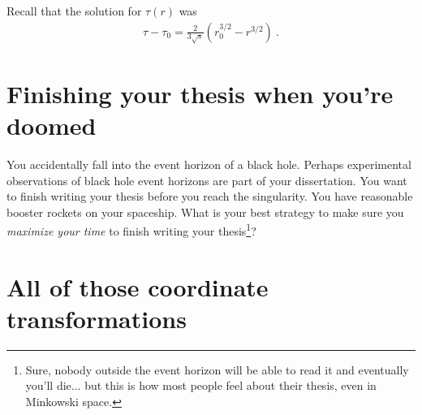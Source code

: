 \documentclass[12pt]{article}
\numberwithin{equation}{section}    %
\begin{document}
Recall that the solution for $\tau(r)$ was
\begin{align}
	\tau - \tau_0 = \frac{2}{3\sqrt{s}} \left(r_0^{3/2} - r^{3/2}\right) \ .
\end{align}

\section{Finishing your thesis when you're doomed}

You accidentally fall into the event horizon of a black hole. Perhaps experimental observations of black hole event horizons are part of your dissertation. You want to finish writing your thesis before you reach the singularity. You have reasonable booster rockets on your spaceship. What is your best strategy to make sure you \emph{maximize your time} to finish writing your thesis\footnote{Sure, nobody outside the event horizon will be able to read it and eventually you'll die... but this is how most people feel about their thesis, even in Minkowski space.}?

\section{All of those coordinate transformations}
\end{document}
